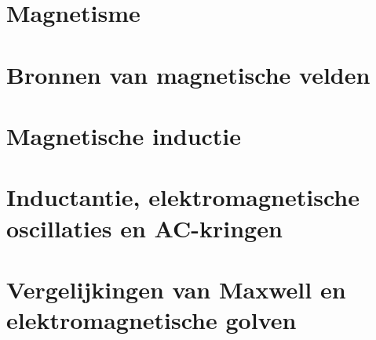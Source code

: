 \section{Magnetisme}

\vspace{0.5cm}



\newpage

\section{Bronnen van magnetische velden}

\vspace{0.5cm}



\newpage

\section{Magnetische inductie}

\vspace{0.5cm}



\newpage

\section{Inductantie, elektromagnetische oscillaties en AC-kringen}

\vspace{0.5cm}



\newpage

\section{Vergelijkingen van Maxwell en elektromagnetische golven}

\vspace{0.5cm}


